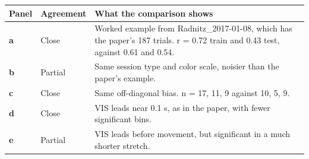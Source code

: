 \begin{longtable}{@{}p{1.1cm}p{2.5cm}p{11.8cm}@{}}
\toprule
Panel & Agreement & What the comparison shows \\
\midrule
\endhead
\textbf{a} & Close & Worked example from Radnitz\_2017-01-08, which has the paper's 187 trials. r = 0.72 train and 0.43 test, against 0.61 and 0.54. \\
\textbf{b} & Partial & Same session type and color scale, noisier than the paper's example. \\
\textbf{c} & Close & Same off-diagonal bias. n = 17, 11, 9 against 10, 5, 9. \\
\textbf{d} & Close & VIS leads near 0.1 s, as in the paper, with fewer significant bins. \\
\textbf{e} & Partial & VIS leads before movement, but significant in a much shorter stretch. \\
\bottomrule
\end{longtable}
